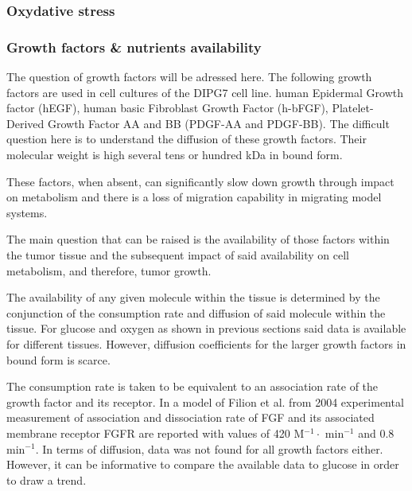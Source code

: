 \documentclass[11pt,a4paper]{article}
\begin{document}
\subsubsection{Oxydative stress} 

\subsubsection{Growth factors \& nutrients availability}
The question of growth factors will be adressed here. The following growth factors are used in cell cultures of the DIPG7 cell line. human Epidermal Growth factor (hEGF), human basic Fibroblast Growth Factor (h-bFGF), Platelet-Derived Growth Factor AA and BB (PDGF-AA and PDGF-BB). The difficult question here is to understand the diffusion of these growth factors. Their molecular weight is high several tens or hundred kDa in bound form.\cite{Taylor1970}

These factors, when absent, can significantly slow down growth through impact on metabolism \cite{Heiden2001} and there is a loss of migration capability in migrating model systems. 

The main question that can be raised is the availability of those factors within the tumor tissue and the subsequent impact of said availability on cell metabolism, and therefore, tumor growth. 

The availability of any given molecule within the tissue is determined by the conjunction of the consumption rate and diffusion of said molecule within the tissue. For glucose and oxygen as shown in previous sections said data is available for different tissues. However, diffusion coefficients for the larger growth factors in bound form is scarce. 

The consumption rate is taken to be equivalent to an association rate of the growth factor and its receptor. In a model of Filion et al. from 2004 experimental measurement of association and dissociation rate of FGF and its associated membrane receptor FGFR are reported with values of 420 \textmu M$^{-1} \cdot $ min$^{-1}$ and 0.8 min$^{-1}$. In terms of diffusion, data was not found for all growth factors either. However, it can be informative to compare the available data to glucose in order  to draw a trend.
\end{document}
